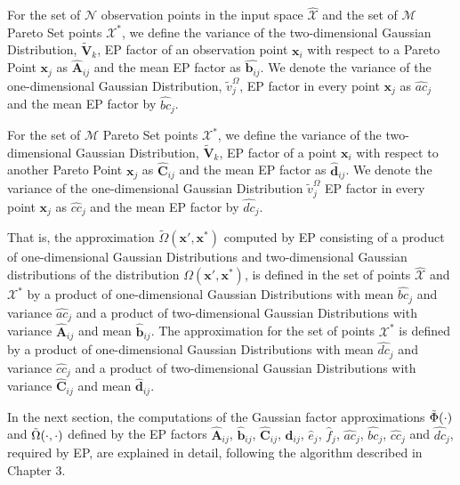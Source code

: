 For the set of $\mathcal{N}$ observation points in the input space $\hat{\mathcal{X}}$ and the set of $\mathcal{M}$ Pareto Set points $\mathcal{X}^*$, we define the variance of the two-dimensional Gaussian Distribution, $\tilde{\boldsymbol{V}}_{k}$, EP factor of an observation point $\boldsymbol{x}_i$ with respect to a Pareto Point $\boldsymbol{x}_j$ as $\hat{\boldsymbol{A}}_{ij}$ and the mean EP factor as $\hat{\boldsymbol{b}_{ij}}$. We denote the variance of the one-dimensional Gaussian Distribution, $\tilde{v}_j^{\Omega}$, EP factor in every point $\boldsymbol{x}_j$ as $\hat{ac}_j$ and the mean EP factor by $\hat{bc}_j$.

For the set of $\mathcal{M}$ Pareto Set points $\mathcal{X}^*$, we define the variance of the two-dimensional Gaussian Distribution, $\tilde{\boldsymbol{V}}_{k}$, EP factor of a point $\boldsymbol{x}_i$ with respect to another Pareto Point $\boldsymbol{x}_j$ as $\hat{\boldsymbol{C}}_{ij}$ and the mean EP factor as $\hat{\boldsymbol{d}}_{ij}$. We denote the variance of the one-dimensional Gaussian Distribution $\tilde{v}_j^{\Omega}$ EP factor in every point $\boldsymbol{x}_j$ as $\hat{cc}_j$ and the mean EP factor by $\hat{dc}_j$.

That is, the approximation $\tilde{\Omega}(\boldsymbol{x}',\boldsymbol{x}^*)$ computed by EP consisting of a product of one-dimensional Gaussian Distributions and two-dimensional Gaussian distributions of the distribution $\Omega(\boldsymbol{x}',\boldsymbol{x}^*)$, is defined in the set of points $\hat{\mathcal{X}}$ and $\mathcal{X}^*$ by a product of one-dimensional Gaussian Distributions with mean $\hat{bc}_j$ and variance $\hat{ac}_j$ and a product of two-dimensional Gaussian Distributions with variance $\hat{\boldsymbol{A}}_{ij}$ and mean $\hat{\boldsymbol{b}}_{ij}$. The approximation for the set of points $\mathcal{X}^*$ is defined by a product of one-dimensional Gaussian Distributions with mean $\hat{dc}_j$ and variance $\hat{cc}_j$ and a product of two-dimensional Gaussian Distributions with variance $\hat{\boldsymbol{C}}_{ij}$ and mean $\hat{\boldsymbol{d}}_{ij}$.

In the next section, the computations of the Gaussian factor approximations $\Tilde{\Phi}(\cdot)$ and $\Tilde{\Omega}(\cdot,\cdot)$ defined by the EP factors $\hat{\boldsymbol{A}}_{ij}$, $\hat{\boldsymbol{b}}_{ij}$, $\hat{\boldsymbol{C}}_{ij}$, $\hat{\boldsymbol{d}}_{ij}$, $\hat{e}_{j}$, $\hat{f}_{j}$, $\hat{ac}_j$, $\hat{bc}_j$, $\hat{cc}_j$ and $\hat{dc}_j$, required by EP, are explained in detail, following the algorithm described in Chapter 3. 
